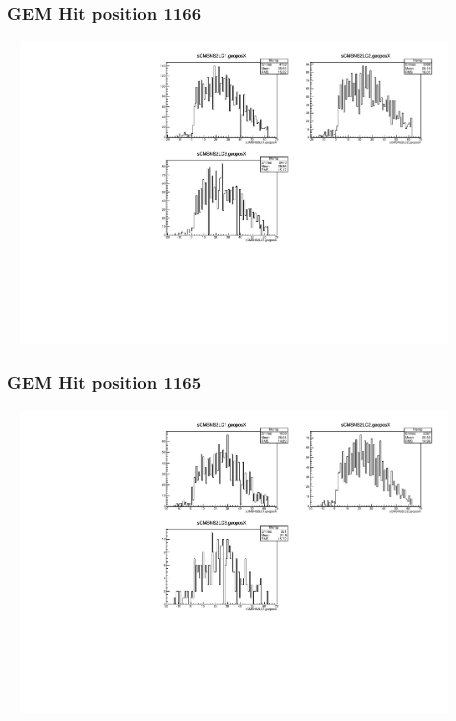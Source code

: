 \documentclass[slidestop,compress,mathserif]{beamer}
\begin{document}
\begin{frame}\frametitle{GEM Hit position 1166}
	 \includegraphics[width=12cm,height=8cm]{GEM_Hit_position_1166.pdf}
\end{frame}
\begin{frame}\frametitle{GEM Hit position 1165}
	 \includegraphics[width=12cm,height=8cm]{GEM_Hit_position_1165.pdf}
\end{frame}
\end{document}

